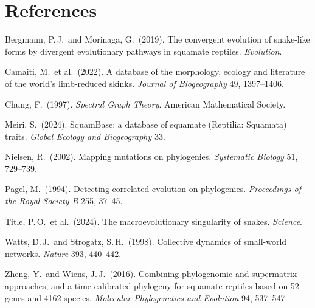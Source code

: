 \documentclass[11pt]{article}
\begin{document}
\normalsize
\section*{References}
{\small
Bergmann, P.\,J.\ and Morinaga, G.\ (2019). The convergent evolution of snake-like forms by divergent evolutionary pathways in squamate reptiles. \textit{Evolution}.\par
Camaiti, M.\ et al.\ (2022). A database of the morphology, ecology and literature of the world's limb-reduced skinks. \textit{Journal of Biogeography} 49, 1397--1406.\par
Chung, F.\ (1997). \textit{Spectral Graph Theory}. American Mathematical Society.\par
Meiri, S.\ (2024). SquamBase: a database of squamate (Reptilia: Squamata) traits. \textit{Global Ecology and Biogeography} 33.\par
Nielsen, R.\ (2002). Mapping mutations on phylogenies. \textit{Systematic Biology} 51, 729--739.\par
Pagel, M.\ (1994). Detecting correlated evolution on phylogenies. \textit{Proceedings of the Royal Society B} 255, 37--45.\par
Title, P.\,O.\ et al.\ (2024). The macroevolutionary singularity of snakes. \textit{Science}.\par
Watts, D.\,J.\ and Strogatz, S.\,H.\ (1998). Collective dynamics of small-world networks. \textit{Nature} 393, 440--442.\par
Zheng, Y.\ and Wiens, J.\,J.\ (2016). Combining phylogenomic and supermatrix approaches, and a time-calibrated phylogeny for squamate reptiles based on 52 genes and 4162 species. \textit{Molecular Phylogenetics and Evolution} 94, 537--547.\par
}
\end{document}
